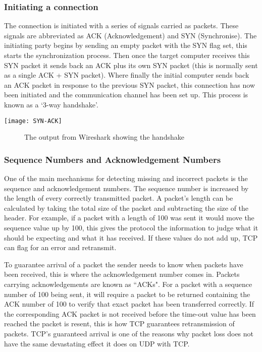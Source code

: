 \subsubsection*{Initiating a connection}
The connection is initiated with a series of signals carried as packets. These signals are abbreviated as ACK (Acknowledgement) and SYN (Synchronise). The initiating party begins by sending an empty packet with the SYN flag set, this starts the synchronization process. Then once the target computer receives this SYN packet it sends back an ACK plus its own SYN packet (this is normally sent as a single ACK + SYN packet). Where finally the initial computer sends back an ACK packet in response to the previous SYN packet, this connection has now been initiated and the communication channel has been set up. This process is known as a `3-way handshake'.

\begin{center}
	\texttt{[image: SYN-ACK]}
	\begin{figure}[h]
		\caption{The output from Wireshark showing the handshake}
	\end{figure}
\end{center}

\clearpage
\subsubsection*{Sequence Numbers and Acknowledgement Numbers}
One of the main mechanisms for detecting missing and incorrect packets is the sequence and acknowledgement numbers. The sequence number is increased by the length of every correctly transmitted packet. A packet's length can be calculated by taking the total size of the packet and subtracting the size of the header. For example, if a packet with a length of 100 was sent it would move the sequence value up by 100, this gives the protocol the information to judge what it should be expecting and what it has received. If these values do not add up, TCP can flag for an error and retransmit.

To guarantee arrival of a packet the sender needs to know when packets have been received, this is where the acknowledgement number comes in. Packets carrying acknowledgements are known as ``ACKs". For a packet with a sequence number of 100 being sent, it will require a packet to be returned containing the ACK number of 100 to verify that exact packet has been transferred correctly. If the corresponding ACK packet is not received before the time-out value has been reached the packet is resent, this is how TCP guarantees retransmission of packets. TCP's guaranteed arrival is one of the reasons why packet loss does not have the same devastating effect it does on UDP with TCP.

